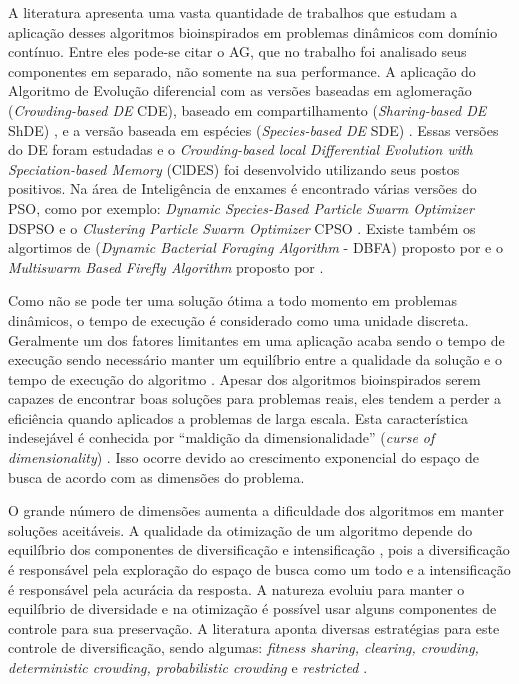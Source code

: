 A literatura apresenta uma vasta quantidade de trabalhos que estudam a aplicação desses algoritmos bioinspirados em problemas dinâmicos com domínio contínuo. Entre eles pode-se citar o AG, que no trabalho \cite{rand2005measurements} foi analisado seus componentes em separado, não somente na sua performance. A aplicação do Algoritmo de Evolução diferencial com as versões baseadas em aglomeração (\textit{Crowding-based DE} CDE), baseado em compartilhamento (\textit{Sharing-based DE} ShDE) \cite{thomsen2004multimodal}, e a versão baseada em espécies (\textit{Species-based DE} SDE) \cite{li2005efficient}. Essas versões do DE foram estudadas e o \textit{Crowding-based local Differential Evolution with Speciation-based Memory} (ClDES) foi desenvolvido utilizando seus postos positivos. Na área de Inteligência de enxames é encontrado várias versões do PSO, como por exemplo: \textit{Dynamic Species-Based Particle Swarm Optimizer} DSPSO \cite{parrott2006locating} e o \textit{Clustering Particle Swarm Optimizer} CPSO \cite{yang2010clustering}. Existe também os algortimos de (\textit{Dynamic Bacterial Foraging Algorithm} - DBFA) proposto por \cite{passino2002biomimicry} e o \textit{Multiswarm Based Firefly Algorithm} proposto por \cite{farahani2011multiswarm}.

Como não se pode ter uma solução ótima a todo momento em problemas dinâmicos, o tempo de execução é considerado como uma unidade discreta. Geralmente um dos fatores limitantes em uma aplicação acaba sendo o tempo de execução sendo necessário manter um equilíbrio entre a qualidade da solução e o tempo de execução do algoritmo \cite{li2006new}. Apesar dos algoritmos bioinspirados serem capazes de encontrar boas soluções para problemas reais, eles tendem a perder a eficiência quando aplicados a problemas de larga escala. Esta característica indesejável é conhecida por “maldição da dimensionalidade” (\textit{curse of dimensionality}) \cite{bellman2015applied}. Isso ocorre devido ao crescimento exponencial do espaço de busca de acordo com as dimensões do problema.

O grande número de dimensões aumenta a dificuldade dos algoritmos em manter soluções aceitáveis. A qualidade da otimização de um algoritmo depende do equilíbrio dos componentes de diversificação e intensificação \cite{boussaid2013survey}, pois a diversificação é responsável pela exploração do espaço de busca como um todo e a intensificação é responsável pela acurácia da resposta. A natureza evoluiu para manter o equilíbrio de diversidade e na otimização é possível usar alguns componentes de controle para sua preservação. A literatura aponta diversas estratégias para este controle de diversificação, sendo algumas: \textit{fitness sharing, clearing, crowding, deterministic crowding, probabilistic crowding} e \textit{restricted} \cite{andre2015multiple}.

